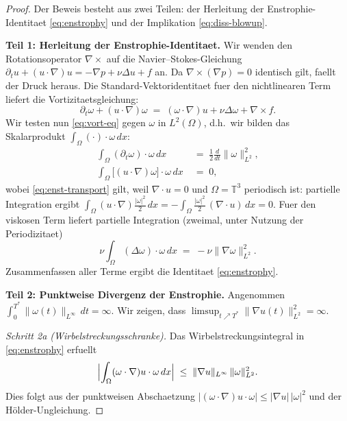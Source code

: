 \documentclass[12pt,a4paper]{article}
\theoremstyle{definition}
\theoremstyle{plain}
\theoremstyle{remark}
\begin{document}
\begin{proof}
Der Beweis besteht aus zwei Teilen: der Herleitung der Enstrophie-Identitaet
\eqref{eq:enstrophy} und der Implikation \eqref{eq:diss-blowup}.

\medskip
\noindent\textbf{Teil 1: Herleitung der Enstrophie-Identitaet.}
Wir wenden den Rotationsoperator $\nabla\times$ auf die Navier--Stokes-Gleichung
$\partial_t u + (u\cdot\nabla)u = -\nabla p + \nu\Delta u + f$ an.
Da $\nabla\times(\nabla p) = 0$ identisch gilt, faellt der Druck heraus.
Die Standard-Vektoridentitaet fuer den nichtlinearen Term liefert die Vortizitaetsgleichung:
\begin{equation}\label{eq:vort-eq}
    \partial_t \omega + (u\cdot\nabla)\omega
    \;=\; (\omega\cdot\nabla)u + \nu\Delta\omega + \nabla\times f.
\end{equation}
Wir testen nun \eqref{eq:vort-eq} gegen $\omega$ in $L^2(\Omega)$, d.h.\
wir bilden das Skalarprodukt $\int_\Omega (\cdot)\cdot\omega\,dx$:
\begin{align}
    \int_\Omega (\partial_t\omega)\cdot\omega\,dx
    &\;=\; \frac{1}{2}\frac{d}{dt}\|\omega\|_{L^2}^2, \label{eq:enst-lhs}\\[4pt]
    \int_\Omega \bigl[(u\cdot\nabla)\omega\bigr]\cdot\omega\,dx
    &\;=\; 0,\label{eq:enst-transport}
\end{align}
wobei \eqref{eq:enst-transport} gilt, weil $\nabla\cdot u = 0$ und
$\Omega = \mathbb{T}^3$ periodisch ist: partielle Integration ergibt
$\int_\Omega (u\cdot\nabla)\tfrac{|\omega|^2}{2}\,dx
= -\int_\Omega \tfrac{|\omega|^2}{2}\,(\nabla\cdot u)\,dx = 0$.
Fuer den viskosen Term liefert partielle Integration (zweimal, unter Nutzung der Periodizitaet)
\[
    \nu\int_\Omega (\Delta\omega)\cdot\omega\,dx
    \;=\; -\nu\|\nabla\omega\|_{L^2}^2.
\]
Zusammenfassen aller Terme ergibt die Identitaet \eqref{eq:enstrophy}.

\medskip
\noindent\textbf{Teil 2: Punktweise Divergenz der Enstrophie.}
Angenommen $\int_0^{T^*}\|\omega(t)\|_{L^\infty}\,dt = \infty$. Wir zeigen,
dass $\limsup_{t \nearrow T^*}\|\nabla u(t)\|_{L^2}^2 = \infty$.

\smallskip
\noindent\emph{Schritt 2a (Wirbelstreckungsschranke).}
Das Wirbelstreckungsintegral in \eqref{eq:enstrophy} erfuellt
\begin{equation}\label{eq:stretch-bound}
    \Bigl|\int_\Omega (\omega\cdot\nabla)u\cdot\omega\,dx\Bigr|
    \;\le\; \|\nabla u\|_{L^\infty}\,\|\omega\|_{L^2}^2.
\end{equation}
Dies folgt aus der punktweisen Abschaetzung
$|(\omega\cdot\nabla)u\cdot\omega| \le |\nabla u|\,|\omega|^2$ und
der H\"older-Ungleichung.


\end{proof}
\end{document}
